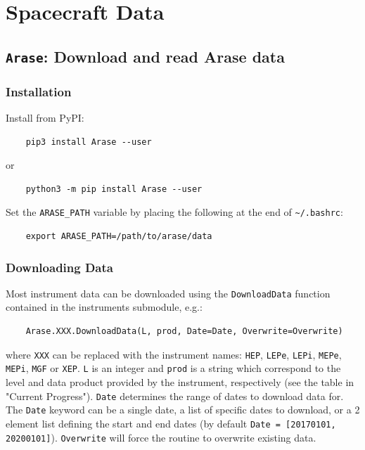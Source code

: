 \chapter{Spacecraft Data}

	\section{\texttt{Arase}: Download and read Arase data}

	\subsection{Installation}

	Install from PyPI:
	
	\begin{verbatim}
	pip3 install Arase --user
	\end{verbatim}
	
	or
	
	\begin{verbatim}
	python3 -m pip install Arase --user
	\end{verbatim}
	
	Set the \texttt{ARASE\_PATH} variable by placing the following at the end of \texttt{\textasciitilde{}/.bashrc}:
	
	\begin{verbatim}
	export ARASE_PATH=/path/to/arase/data
	\end{verbatim}
	
	\subsection{Downloading Data}
	
	Most instrument data can be downloaded using the \texttt{DownloadData} function contained in the instruments submodule, e.g.:
	
	\begin{verbatim}
	Arase.XXX.DownloadData(L, prod, Date=Date, Overwrite=Overwrite)
	\end{verbatim}
	
	where \texttt{XXX} can be replaced with the instrument names: \texttt{HEP}, \texttt{LEPe}, \texttt{LEPi}, \texttt{MEPe}, \texttt{MEPi}, \texttt{MGF} or \texttt{XEP}. \texttt{L} is an integer and \texttt{prod} is a string which correspond to the level and data product provided by the instrument, respectively (see the table in "Current Progress"). \texttt{Date} determines the range of dates to download data for. The \texttt{Date} keyword can be a single date, a list of specific dates to download, or a 2 element list defining the start and end dates (by default \texttt{Date = [20170101, 20200101]}). \texttt{Overwrite} will force the routine to overwrite existing data.
	

